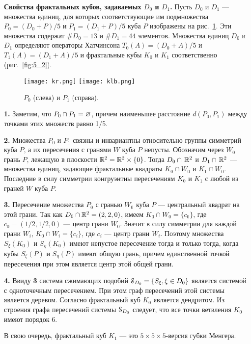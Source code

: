 {\bf Свойства фрактальных кубов, задаваемых $ D_0$ и  $ D_1$.}
Пусть $ D_0$ и $ D_1$ --- множества единиц, для которых соответствующие им подмножества $P_0=( D_0+P)/5$  и $P_1=( D_1+P)/5$ куба $P$ изображены на рис.~\ref{fig:5_1}. 
Эти множества содержат $\# D_0=13$ и $\# D_1= 44$ элементов.
 Множества единиц $ D_0$ и $ D_1$ определяют операторы Хатчинсона $ T_0(A)=( D_0+A)/{5}$   и $T_1(A)=( D_1+A)/{5}$   и фрактальные кубы $K_0$ и $K_1$ соответственно (рис.~\ref{fig:5_2}).

\begin{figure}[H]
\centering
\qquad
\texttt{[image: kr.png]}
\hfill
\texttt{[image: klb.png]}
\qquad
\caption{ $P_0$ (слева) и $P_1$ (справа).}
\label{fig:5_1}
\end{figure}


{\bf 1.} Заметим, что $P_0\cap P_1=\varnothing$, причем наименьшее расстояние $d(P_0,P_1)$ между точками этих множеств  равно 1/5.\smallskip

{\bf 2.} Множества $P_0$ и $P_1$ связны  и  инвариантны относительно группы симметрий куба $P$,  а их пересечения с гранями $W$ куба $P$ непусты. 
Обозначим через $W_0$   грань  $P$, лежащую в плоскости $\mathbb{R}^2=\mathbb{R}^2\times\{0\}$. 
Тогда $ D_0\cap\, \mathbb{R}^2$ и $ D_1\cap\, \mathbb{R}^2$ --- множества единиц, задающие фрактальные квадраты $K_0\cap W_0$ и $K_1\cap W_0$. 
Последние в силу симметрии конгруэнтны пересечениям $K_0$ и $K_1$ с любой из граней $W$ куба $P$.\smallskip

{\bf 3.} Пересечение множества $P_0$  с гранью $W_0$ куба $P$ --- центральный квадрат  на этой грани. 
Так как $ D_0\cap \mathbb{R}^2=(2,2,0)$,  имеем $K_0\cap W_0=\{c_0\} $, где $c_0=(1/2,1/2,0)$ --- центр грани $W_0$. 
Значит в силу симметрии для каждой грани $W_i$,  $K_0\cap W_i=\{c_i\} $, где $c_i$ --- центр грани $W_i$. 
Поэтому множества $S_\xi(K_0)$ и $S_\eta(K_0)$ имеют непустое пересечение тогда и только тогда, когда кубы  $S_\xi(P)$ и $S_\eta(P)$ имеют общую грань, причем   единственной точкой пересечения при этом является центр этой общей грани.\smallskip

{\bf 4.} Ввиду {\bf 3} система сжимающих подобий ${\EuScript S}_{ D_0}=\{S_\xi,\xi\in  D_0\}$ является системой с одноточечным пересечением. 
При этом  граф пересечений этой системы является деревом. 
Согласно \cite[Theorem 1.7]{FIP} фрактальный куб $K_0$ является дендритом.
Из строения графа пересечений системы ${\EuScript S}_{D_0}$ следует, что  все точки ветвления $K_0$ имеют порядок 6.\smallskip

В свою очередь, фрактальный куб $ K_1$ --- это $ 5\times 5\times 5 $-версия губки Менгера.

